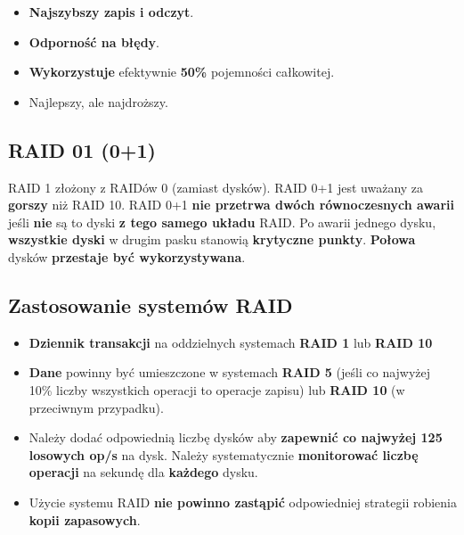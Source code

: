 \documentclass[a4paper]{article}
\begin{document}
\begin{itemize}
    \item \textbf{Najszybszy zapis i odczyt}.
    \item \textbf{Odporność na błędy}.
    \item \textbf{Wykorzystuje} efektywnie \textbf{50\%} pojemności całkowitej.
    \item Najlepszy, ale najdroższy.
\end{itemize}

\subsection{RAID 01 (0+1)}
RAID 1 złożony z RAIDów 0 (zamiast dysków).
RAID 0+1 jest uważany za \textbf{gorszy} niż RAID 10.
RAID 0+1 \textbf{nie przetrwa dwóch równoczesnych
awarii} jeśli \textbf{nie} są to dyski \textbf{z tego samego układu} RAID. Po awarii jednego dysku, \textbf{wszystkie dyski} w drugim pasku stanowią \textbf{krytyczne punkty}. \textbf{Połowa} dysków \textbf{przestaje być wykorzystywana}.

\begin{center}
\end{center}


\subsection{Zastosowanie systemów RAID}
\begin{itemize}
    \item \textbf{Dziennik transakcji} na oddzielnych systemach \textbf{RAID 1} lub \textbf{RAID 10}
    \item \textbf{Dane} powinny być umieszczone w systemach \textbf{RAID 5} (jeśli co najwyżej 10\% liczby wszystkich operacji to operacje zapisu) lub \textbf{RAID 10} (w przeciwnym przypadku).
    \item Należy dodać odpowiednią liczbę dysków aby \textbf{zapewnić co najwyżej 125 losowych op/s} na dysk. Należy systematycznie \textbf{monitorować liczbę operacji} na sekundę dla \textbf{każdego} dysku.
    \item Użycie systemu RAID \textbf{nie powinno zastąpić} odpowiedniej strategii robienia \textbf{kopii zapasowych}.
\end{itemize}
\end{document}

